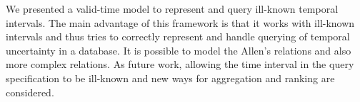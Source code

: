 We presented a valid-time model to represent and query ill-known temporal intervals. The main advantage of this framework is that it works with ill-known intervals and thus tries to correctly represent and handle querying of temporal uncertainty in a database. 
It is possible to model the Allen's relations and also more complex relations. As future work, allowing the time interval in the query specification to be ill-known and new ways for aggregation and ranking are considered. 